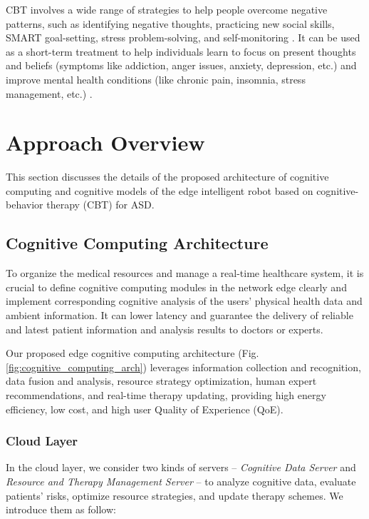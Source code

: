 \documentclass[letterpaper]{article} %
\begin{document}
CBT involves a wide range of strategies to help people overcome negative patterns, such as identifying negative thoughts, practicing new social skills, SMART goal-setting, stress problem-solving, and self-monitoring \cite{beck2020cognitive}. It can be used as a short-term treatment to help individuals learn to focus on present thoughts and beliefs (symptoms like addiction, anger issues, anxiety, depression, etc.) and improve mental health conditions (like chronic pain, insomnia, stress management, etc.) \cite{hofmann2012efficacy}.

\section{Approach Overview}
This section discusses the details of the proposed architecture of cognitive computing and cognitive models of the edge intelligent robot based on cognitive-behavior therapy (CBT) for ASD.

\subsection{Cognitive Computing Architecture}

To organize the medical resources and manage a real-time healthcare system, it is crucial to define cognitive computing modules in the network edge clearly and implement corresponding cognitive analysis of the users' physical health data and ambient information. It can lower latency and guarantee the delivery of reliable and latest patient information and analysis results to doctors or experts.

Our proposed edge cognitive computing architecture (Fig. \ref{fig:cognitive_computing_arch}) leverages information collection and recognition, data fusion and analysis, resource strategy optimization, human expert recommendations, and real-time therapy updating, providing high energy efficiency, low cost, and high user Quality of Experience (QoE).

\subsubsection{Cloud Layer}

In the cloud layer, we consider two kinds of servers -- \textit{Cognitive Data Server} and \textit{Resource and Therapy Management Server} -- to analyze cognitive data, evaluate patients' risks, optimize resource strategies, and update therapy schemes. We introduce them as follow:
\end{document}
